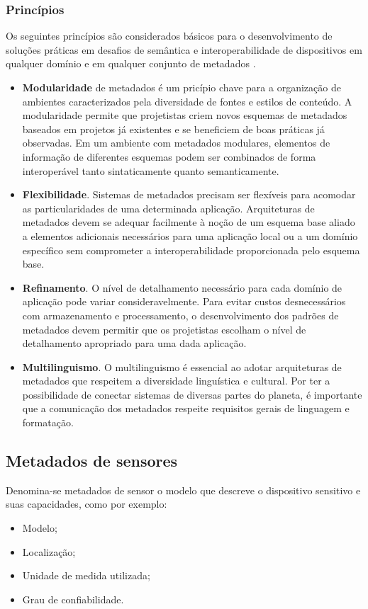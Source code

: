 		\subsubsection{Princípios}
    \quad Os seguintes princípios são considerados básicos para o desenvolvimento de soluções práticas em desafios de semântica
    e interoperabilidade de dispositivos em qualquer domínio e em qualquer conjunto de metadados \cite{metadata}.
		\begin{itemize}
		  \item \textbf{Modularidade} de metadados é um pricípio chave para a organização de ambientes caracterizados pela diversidade de fontes e estilos
      de conteúdo. A modularidade permite que projetistas criem novos esquemas de metadados baseados em projetos
      já existentes e se beneficiem de boas práticas já observadas. Em um ambiente com metadados modulares, elementos de informação de diferentes esquemas
      podem ser combinados de forma interoperável tanto sintaticamente quanto semanticamente.
      \item \textbf{Flexibilidade}. Sistemas de metadados precisam ser flexíveis para acomodar as particularidades de uma determinada aplicação.
      Arquiteturas de metadados devem se adequar facilmente à noção de um esquema base aliado a elementos adicionais necessários para uma aplicação local ou a um
      domínio específico sem comprometer a interoperabilidade proporcionada pelo esquema base.
      \item \textbf{Refinamento}. O nível de detalhamento necessário para cada domínio de aplicação pode variar consideravelmente. Para evitar custos
      desnecessários com armazenamento e processamento, o desenvolvimento dos padrões de metadados devem permitir que os projetistas
      escolham o nível de detalhamento apropriado para uma dada aplicação.
      \item \textbf{Multilinguismo}. O multilinguismo é essencial ao adotar arquiteturas de metadados que respeitem a diversidade linguística e cultural.
      Por ter a possibilidade de conectar sistemas de diversas partes do planeta, é importante que a comunicação dos metadados respeite requisitos gerais de linguagem e formatação.
		\end{itemize}
  \subsection{Metadados de sensores}
    \quad Denomina-se metadados de sensor o modelo que descreve o dispositivo sensitivo e suas capacidades, como por exemplo:
    \begin{itemize}
      \item Modelo;
      \item Localização;
      \item Unidade de medida utilizada;
      \item Grau de confiabilidade.
    \end{itemize}


